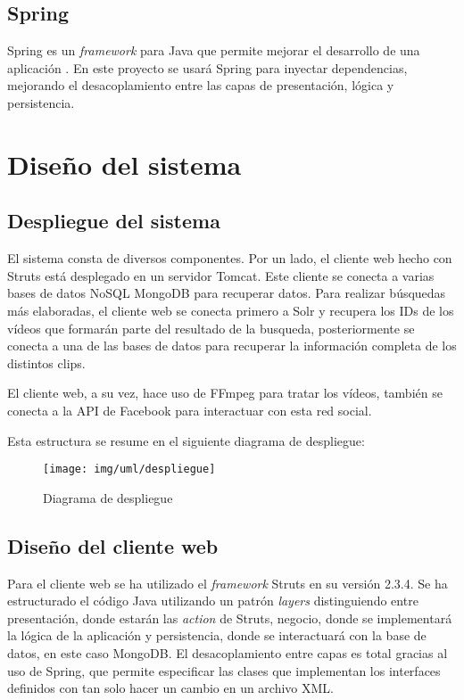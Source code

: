 \documentclass[11pt]{book}
\begin{document}
\section{Spring}
Spring es un \textit{framework} para Java que permite mejorar el desarrollo de una aplicación \cite{spring}. En este proyecto se usará Spring para inyectar dependencias, mejorando el desacoplamiento entre las capas de presentación, lógica y persistencia.
\chapter{Diseño del sistema}
\section{Despliegue del sistema}
El sistema consta de diversos componentes. Por un lado, el cliente web hecho con Struts está desplegado en un servidor Tomcat. Este cliente se conecta a varias bases de datos NoSQL MongoDB para recuperar datos. Para realizar búsquedas más elaboradas, el cliente web se conecta primero a Solr y recupera los IDs de los vídeos que formarán parte del resultado de la busqueda, posteriormente se conecta a una de las bases de datos para recuperar la información completa de los distintos clips.

El cliente web, a su vez, hace uso de FFmpeg para tratar los vídeos, también se conecta a la API de Facebook para interactuar con esta red social.

Esta estructura se resume en el siguiente diagrama de despliegue:

\begin{figure}[ht]
\centering
\texttt{[image: img/uml/despliegue]}
\caption{Diagrama de despliegue}
\label{uml:despliegue}
\end{figure}
\section{Diseño del cliente  web}
Para el cliente web se ha utilizado el \textit{framework} Struts en su versión 2.3.4. Se ha estructurado el código Java utilizando un patrón \textit{layers} distinguiendo entre presentación, donde estarán las \textit{action} de Struts, negocio, donde se implementará la lógica de la aplicación y persistencia, donde se interactuará con la base de datos, en este caso MongoDB. El desacoplamiento entre capas es total gracias al uso de Spring, que permite especificar las clases que implementan los interfaces definidos con tan solo hacer un cambio en un archivo XML.
\end{document}
